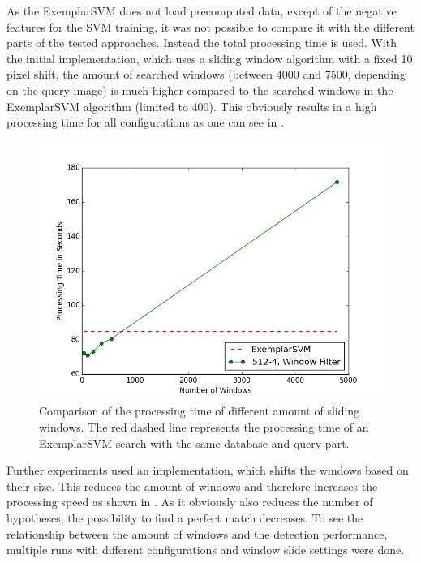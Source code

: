 As the ExemplarSVM does not load precomputed data, except of the negative features for the \ac{SVM} training, it was not possible to compare it with the different parts of the tested approaches. Instead the total processing time is used.
With the initial implementation, which uses a sliding window algorithm with a fixed 10 pixel shift, the amount of searched windows (between 4000 and 7500, depending on the query image) is much higher compared to the searched windows in the ExemplarSVM algorithm (limited to 400). This obviously results in a high processing time for all configurations as one can see in .

\begin{figure}
\centering
\includegraphics[width=0.7\linewidth]{images/window_comparison-512-4-filtered}
\caption[Window comparison]{Comparison of the processing time of different amount of sliding windows. The red dashed line represents the processing time of an ExemplarSVM search with the same database and query part.}
\label{fig:processing_time_windows}
\end{figure}


Further experiments used an implementation, which shifts the windows based on their size. This reduces the amount of windows and therefore increases the processing speed as shown in .
As it obviously also reduces the number of hypotheses, the possibility to find a perfect match decreases. To see the relationship between the amount of windows and the detection performance, multiple runs with different configurations and window slide settings were done.

